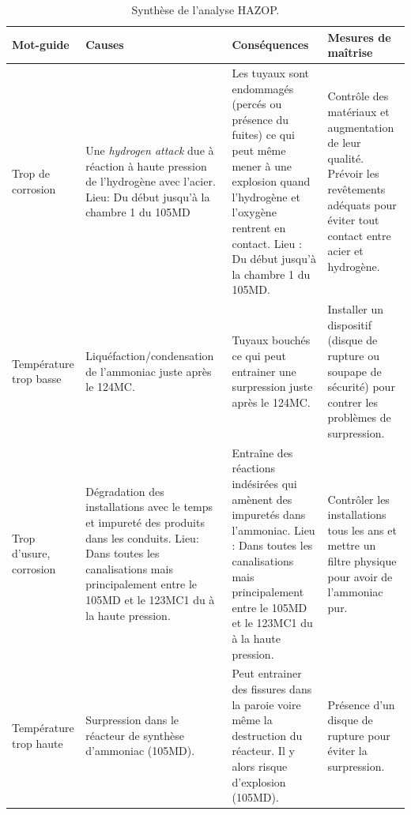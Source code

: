 	\begin{table}[ht!]
		\centering
		{
			\begin{tabular}{|p{0.25\textwidth}|p{}|p{}|p{}|}
				\rowcolor{Gray} Mot-guide		& Causes 	& Conséquences 	&	Mesures de maîtrise 	\\
				\hline
				Trop de corrosion		 
				& Une \textit{hydrogen attack} due à réaction à haute pression 
				de l'hydrogène avec l'acier. Lieu: Du début jusqu'à la chambre 1 du 105MD
				& Les tuyaux sont endommagés (percés ou présence du fuites) ce qui peut
				même mener à une explosion quand l'hydrogène et l'oxygène rentrent en contact. 
				Lieu : Du début jusqu'à la chambre 1 du 105MD.	 
				& Contrôle des matériaux	et augmentation de leur qualité. Prévoir les revêtements adéquats pour éviter tout contact entre acier et hydrogène. 	\\				
				\hline
				Température	trop basse	
				& Liquéfaction/condensation de l'ammoniac juste après le 124MC.	
				& Tuyaux bouchés ce qui peut entrainer une surpression juste après le 124MC.  
				& Installer un dispositif (disque de rupture ou soupape de sécurité) pour contrer
					les problèmes de surpression. \\
				\hline 
				Trop d'usure, corrosion	
				& Dégradation des installations avec le temps et impureté des produits 
				dans les conduits. Lieu: Dans toutes les canalisations mais principalement entre 
				le 105MD et le 123MC1 du à la haute pression.	
				& Entraîne des réactions indésirées qui amènent des impuretés dans l'ammoniac. 
				Lieu : Dans toutes les canalisations mais principalement entre le 105MD et le 123MC1 
				du à la haute pression.	 
				&  Contrôler les installations tous les ans et mettre un filtre physique pour avoir de l'ammoniac pur.	\\
				\hline
				Température trop haute	
				&	Surpression dans le réacteur de synthèse d'ammoniac (105MD).				
				& Peut entrainer des fissures dans la paroie voire même la destruction du réacteur. 
				Il y alors risque d'explosion (105MD).							
				& Présence d'un disque de rupture pour éviter la surpression. \\
				\hline
			\end{tabular}
		}
		\caption{Synthèse de l'analyse HAZOP.}
	\end{table}

\newpage
{}

